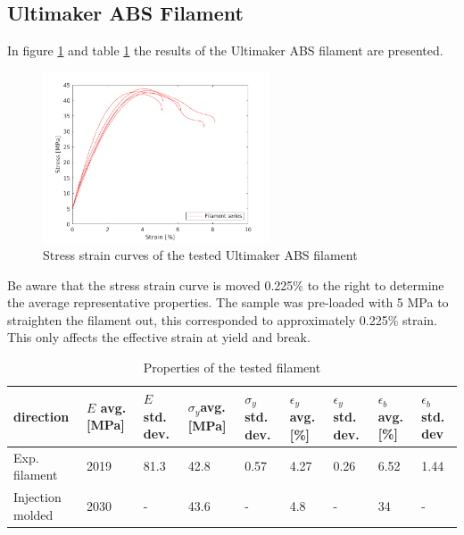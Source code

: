 \subsection{Ultimaker ABS Filament}
In figure \ref{fig:filamentresults} and table \ref{tab:additionalresults} the results of the Ultimaker ABS filament are presented.
\begin{figure}[H]
    \centering
    \includegraphics[width=0.60\textwidth]{chapter_5_Experimentaltesting/figures/filamentdata.png}
    \caption{Stress strain curves of the tested Ultimaker ABS filament}
    \label{fig:filamentresults}
\end{figure}
Be aware that the stress strain curve is moved 0.225\% to the right to determine the average representative properties. The sample was pre-loaded with 5 MPa to straighten the filament out, this corresponded to approximately 0.225\% strain. This only affects the effective strain at yield and break.
\begin{table}
\caption{Properties of the tested filament}
\begin{tabular}{ p{2cm}p{0.9cm}p{0.9cm}p{0.9cm}p{1cm}p{1cm}p{1cm}p{1cm}p{1cm}  }
 \hline
direction & $E$ avg. [MPa] & $E$ std. dev. & $\sigma_y$avg. [MPa] & $\sigma_y$ std. dev. & $\epsilon_y$ avg. [\%] & $\epsilon_y$   std. dev. & $\epsilon_b$ avg. [\%] & $\epsilon_b$   std. dev \\
 \hline
Exp. filament & 2019 & 81.3 & 42.8 & 0.57 & 4.27 & 0.26 & 6.52 & 1.44\\
Injection molded \cite{Ultimaker2018TechnicalABS} & 2030 & - & 43.6 & - & 4.8 & - & 34 & -\\
 \hline
\end{tabular}
     \label{tab:additionalresults}
 \end{table}

